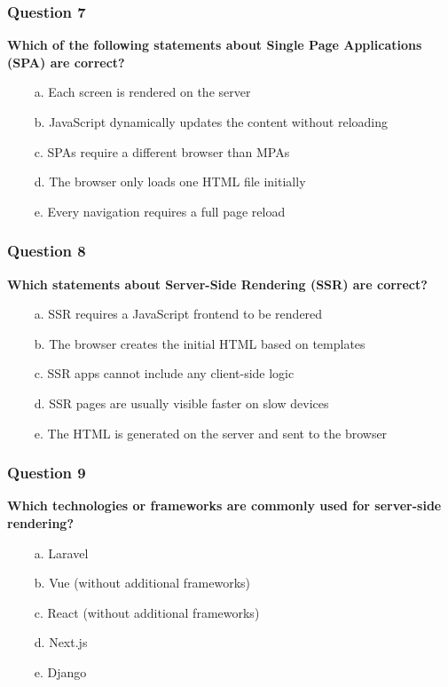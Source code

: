 \documentclass{article}
\newcommand{\cmark}{\textcolor{green}{\ding{51}}} %
\newcommand{\xmark}{\textcolor{red}{\ding{55}}}   %
\begin{document}
\subsubsection*{Question 7}
\textbf{Which of the following statements about Single Page Applications (SPA) are correct?}

\begin{itemize}
  \item[\xmark\ a.] Each screen is rendered on the server
  \item[\cmark\ b.] JavaScript dynamically updates the content without reloading
  \item[\xmark\ c.] SPAs require a different browser than MPAs
  \item[\cmark\ d.] The browser only loads one HTML file initially
  \item[\xmark\ e.] Every navigation requires a full page reload
\end{itemize}

\subsubsection*{Question 8}
\textbf{Which statements about Server-Side Rendering (SSR) are correct?}

\begin{itemize}
  \item[\xmark\ a.] SSR requires a JavaScript frontend to be rendered
  \item[\xmark\ b.] The browser creates the initial HTML based on templates
  \item[\xmark\ c.] SSR apps cannot include any client-side logic
  \item[\cmark\ d.] SSR pages are usually visible faster on slow devices
  \item[\cmark\ e.] The HTML is generated on the server and sent to the browser
\end{itemize}

\subsubsection*{Question 9}
\textbf{Which technologies or frameworks are commonly used for server-side rendering?}

\begin{itemize}
  \item[\cmark\ a.] Laravel
  \item[\xmark\ b.] Vue (without additional frameworks)
  \item[\xmark\ c.] React (without additional frameworks)
  \item[\cmark\ d.] Next.js
  \item[\cmark\ e.] Django
\end{itemize}
\end{document}
